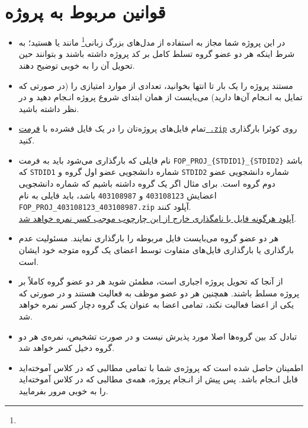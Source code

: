 \section{قوانین مربوط به پروژه}

\begin{itemize}
    \item {
        در این پروژه شما مجاز به استفاده از مدل‌های بزرگ زبانی\footnote{} مانند  یا  هستید؛ به شرط اینکه هر دو عضو گروه تسلط کامل بر کد پروژه داشته باشند و بتوانند حین تحویل آن را به خوبی توضیح دهند.
    }
    \item {
        مستند پروژه را یک بار تا انتها بخوانید، تعدادی از موارد امتیازی را (در صورتی که تمایل به انـجام آن‌ها دارید) می‌بایست از همان ابتدای شروع پروژه انـجام دهید و در نظر داشته باشید.
    }
    \item {
        تمام فایل‌های پروژه‌تان را در یک فایل فشرده با \underline{فرمت \,\texttt{.zip}}  روی کوئرا بارگذاری کنید.
    }
    \item {
        نام فایلی که بارگذاری می‌شود باید به فرمت \texttt{FOP\_PROJ\_\{STDID1\}\_\{STDID2\}} باشد که \texttt{STDID1} شماره دانشجویی عضو اول گروه و \texttt{STDID2} شماره دانشجویی عضو دوم گروه است.
        برای مثال اگر یک گروه داشته باشیم که شماره دانشجویی اعضایش \texttt{403108123} و \texttt{403108987} باشد،
        باید فایلی به نام \texttt{FOP\_PROJ\_403108123\_403108987.zip} آپلود کنند.\\
        {\large \underline{آپلود هرگونه فایل با نامگذاری خارج از این چارچوب موجب کسر نمره خواهد شد}.}
    }
    \item {
        هر دو عضو گروه می‌بایست فایل مربوطه را بارگذاری نمایند. مسئولیت عدم بارگذاری یا بارگذاری فایل‌های متفاوت توسط اعضای یک گروه متوجه خود ایشان است.
    }
    \item {
        از آنجا که تحویل پروژه اجباری است، مطمئن شوید هر دو عضو گروه کاملاً بر پروژه مسلط باشند. همچنین هر دو عضو موظف به فعالیت هستند و در صورتی که یکی از اعضا فعالیت نکند، تمامی اعضا به عنوان یک گروه دچار کسر نمره خواهد شد.
    }
    \item {
        تبادل کد بین گروه‌ها اصلا مورد پذیرش نیست و در صورت تشخیص، نمره‌ی هر دو گروه دخیل کسر خواهد شد.
    }
    \item {
        اطمینان حاصل شده است که پروژه‌ی شما با تمامی مطالبی که در کلاس آموخته‌اید قابل انـجام باشد. پس پیش از انـجام پروژه، همه‌ی مطالبی که در کلاس آموخته‌اید را به خوبی مرور بفرمایید.
    }
\end{itemize}
